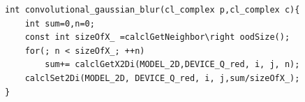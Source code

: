 \begin{minipage}{\linewidth}
\begin{lstlisting}
int convolutional_gaussian_blur(cl_complex p,cl_complex c){
	int sum=0,n=0;
	const int sizeOfX_ =calclGetNeighbor\right oodSize();
	for(; n < sizeOfX_; ++n) 
		sum+= calclGetX2Di(MODEL_2D,DEVICE_Q_red, i, j, n);
	calclSet2Di(MODEL_2D, DEVICE_Q_red, i, j,sum/sizeOfX_);
}
\end{lstlisting}
\end{minipage}
